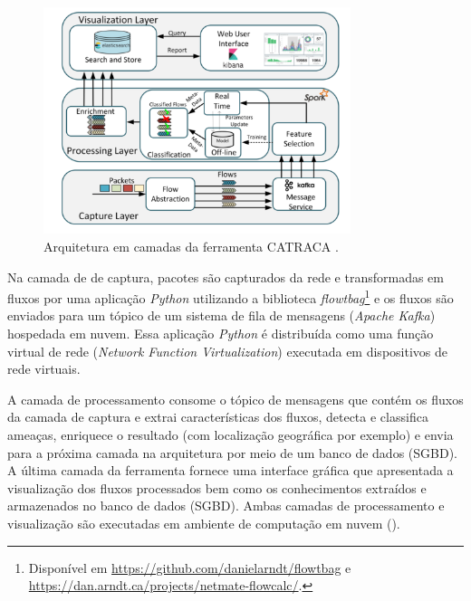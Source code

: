 \begin{figure}[ht]
\centering
\includegraphics[width=0.8\textwidth]{figuras/catraca-arch.png}
\caption{Arquitetura em camadas da ferramenta CATRACA \cite{Lopez2018}.}
\label{fig:catraca}
\end{figure}


Na camada de de captura, pacotes são capturados da rede e transformadas em fluxos
por uma aplicação \emph{Python} utilizando a biblioteca \emph{flowtbag}\footnote{
    Disponível em \url{https://github.com/danielarndt/flowtbag} e
    \url{https://dan.arndt.ca/projects/netmate-flowcalc/}.
}
e os fluxos são enviados para um tópico de um sistema de fila de mensagens
(\emph{Apache Kafka}) hospedada em nuvem.
Essa aplicação \emph{Python} é distribuída como uma função virtual de rede
(\emph{Network Function Virtualization}) executada em dispositivos de rede
virtuais.

A camada de processamento consome o tópico de mensagens que contém os fluxos
da camada de captura e extrai características dos fluxos, detecta e classifica ameaças,
enriquece o resultado (com localização geográfica por exemplo) e envia para a
próxima camada na arquitetura por meio de um banco de dados (SGBD).
A última camada da ferramenta fornece uma interface gráfica que apresentada a
visualização dos fluxos processados bem como os conhecimentos extraídos e
armazenados no banco de dados (SGBD).
Ambas camadas de processamento e visualização são executadas em ambiente de
computação em nuvem (\cloud).


